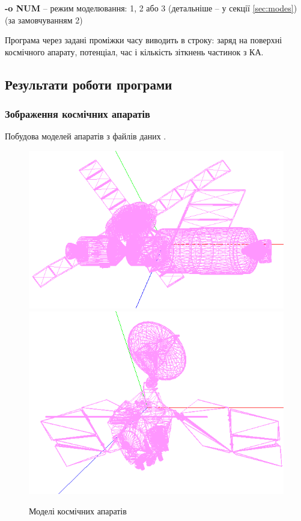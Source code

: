\documentclass[a4paper,12pt]{article}
\begin{document}
    \textbf{-o NUM} -- режим моделювання: 1, 2 або 3 (детальніше -- у секції \ref{sec:modes}) (за замовчуванням 2)
    
Програма через задані проміжки часу виводить в строку: заряд на поверхні космічного апарату, потенціал, час і кількість зіткнень частинок з КА.
 
\subsection{Результати роботи програми}

\subsubsection{Зображення космічних апаратів}
Побудова моделей апаратів з файлів даних \cite{nasa}.

\begin{figure}[!htp]
\centering
\includegraphics[scale=0.75]{screens/screenshot1.png}
\includegraphics[scale=0.75]{screens/screenshot2.png}
\caption{Моделі космічних апаратів}
\label{}
\end{figure}
\end{document}
